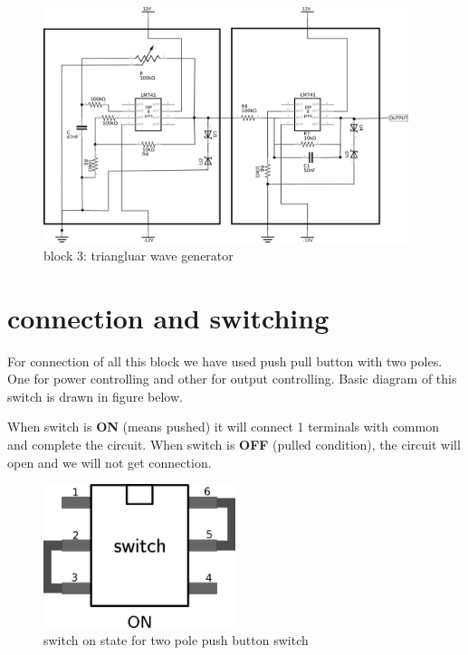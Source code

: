 \documentclass{article}
\begin{document}
\begin{figure}[H]
    \centering
    \label{tringularreal}
    \includegraphics[width=0.95\textwidth]{imgs/triangreal.png}
    \caption{block 3: triangluar wave generator}
\end{figure}



\section{connection and switching}
\label{sec:orgf28586f}

For connection of all this block we have used push pull button with two poles. One for power controlling and other for output controlling. Basic diagram of this switch is drawn in figure below.

When switch is \textbf{\textbf{ON}} (means pushed) it will connect 1 terminals with common and complete the circuit. When switch is \textbf{\textbf{OFF}} (pulled condition), the circuit will open and we will not get connection.

\begin{figure}[H]
    \centering
    \label{switchon}
    \includegraphics[width=0.5\textwidth]{imgs/switchon.png}
    \caption{switch on state for two pole push button switch}
\end{figure}
\end{document}
